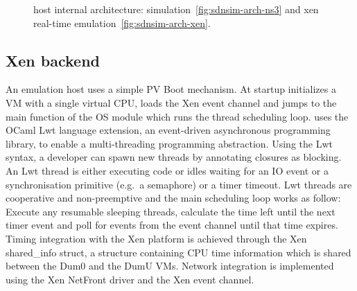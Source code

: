 \begin{figure}[ht] 
\centering
{}
\caption{\sdnsim host internal architecture: 
  simulation~\ref{fig:sdnsim-arch-ns3} and xen real-time
  emulation~\ref{fig:sdnsim-arch-xen}.}
\label{fig:sdnsim-arch}
\end{figure}


\subsection{Xen backend}

An \sdnsim emulation host uses a simple PV Boot mechanism. At startup \sdnsim
initializes a VM with a single virtual CPU, loads the Xen event channel and
jumps to the main function of the OS module which runs the thread scheduling
loop.  \sdnsim uses the OCaml Lwt language extension, an event-driven
asynchronous programming library, to enable a multi-threading programming
abstraction.  Using the Lwt syntax, a developer can spawn new threads by
annotating closures as blocking. An Lwt thread is either executing code or idles
waiting for an IO event or a synchronisation primitive (e.g.~a semaphore) or a
timer timeout.  Lwt threads are cooperative and non-preemptive and the main
scheduling loop works as follow: Execute any resumable sleeping threads,
calculate the time left until the next timer event and poll for events from the
event channel until that time expires.  Timing integration with the Xen platform
is achieved through the Xen shared\_info struct, a structure containing CPU time
information which is shared between the Dum0 and the DumU VMs.  Network
integration is implemented using the Xen NetFront driver and the Xen event
channel.

